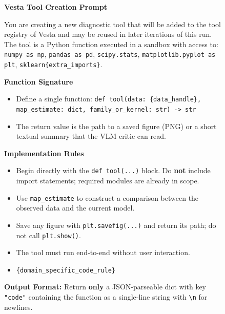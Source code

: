 \documentclass{article}
\newcommand{\method}{{\sc Vesta}}
\begin{document}
\begin{figure}[h]
\small
\begin{mdframed}[linecolor=gray!50, backgroundcolor=gray!5, linewidth=0.8pt]

\textbf{\method{} Tool Creation Prompt}

\medskip
You are creating a new diagnostic tool that will be added to the tool
registry of \method{} and may be reused in later iterations of this run.
The tool is a Python function executed in a sandbox with access to:
\texttt{numpy as np}, \texttt{pandas as pd}, \texttt{scipy.stats},
\texttt{matplotlib.pyplot as plt}, \texttt{sklearn}\texttt{\{extra\_imports\}}.

\medskip
\textbf{Function Signature}
\begin{itemize}[leftmargin=*, nosep]
    \item Define a single function:
          \texttt{def tool(data: \{data\_handle\}, map\_estimate: dict, family\_or\_kernel: str) -> str}
    \item The return value is the path to a saved figure (PNG) or a short
          textual summary that the VLM critic can read.
\end{itemize}

\medskip
\textbf{Implementation Rules}
\begin{itemize}[leftmargin=*, nosep]
    \item Begin directly with the \texttt{def tool(...)} block. Do
          \textbf{not} include import statements; required modules are
          already in scope.
    \item Use \texttt{map\_estimate} to construct a comparison between the
          observed data and the current model.
    \item Save any figure with \texttt{plt.savefig(...)} and return its
          path; do not call \texttt{plt.show()}.
    \item The tool must run end-to-end without user interaction.
    \item \texttt{\{domain\_specific\_code\_rule\}}
\end{itemize}

\medskip
\textbf{Output Format:} Return \textbf{only} a JSON-parseable dict with key
\texttt{"code"} containing the function as a single-line string with
\texttt{\textbackslash n} for newlines.


\end{mdframed}
\end{figure}
\end{document}
